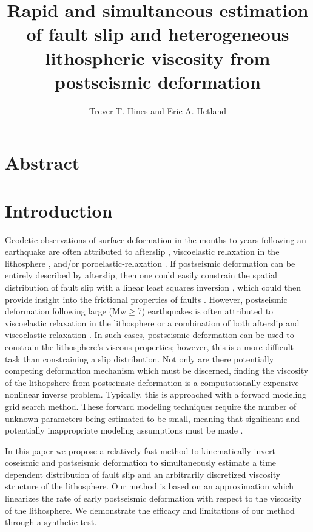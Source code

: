 \documentclass[12pt]{article}
\begin{document}
\title{Rapid and simultaneous estimation of fault slip and
  heterogeneous lithospheric viscosity from postseismic deformation}
\author{Trever T. Hines and Eric A. Hetland} \maketitle
\section{Abstract}

\section{Introduction}
Geodetic observations of surface deformation in the months to years
following an earthquake are often attributed to afterslip
\citep[e.g.][]{M1991}, viscoelastic relaxation in the lithosphere
\citep[e.g.][]{NM1974}, and/or poroelastic-relaxation
\citep[e.g.][]{P1998,J2003}.  If postseismic deformation can be
entirely described by afterslip, then one could easily constrain the
spatial distribution of fault slip with a linear least squares
inversion \citep[e.g.][]{F2007,B2002,H1987}, which could then provide
insight into the frictional properties of faults
\citep[e.g.][]{B2009}.  However, postseismic deformation following
large (Mw$\geq$7) earthquakes is often attributed to viscoelastic
relaxation in the lithosphere \citep[e.g.][]{P2003,P2005,HH2003} or a
combination of both afterslip and viscoelastic relaxation
\citep[e.g.][]{H2008,R2015}.  In such cases, postseismic deformation
can be used to constrain the lithosphere's viscous properties;
however, this is a more difficult task than constraining a slip
distribution.  Not only are there potentially competing deformation
mechanism which must be discerned, finding the viscosity of
the lithopshere from postseimsic deformation is a computationally
expensive nonlinear inverse problem.  Typically, this is approached
with a forward modeling grid search method.  These forward modeling
techniques require the number of unknown parameters being estimated to
be small, meaning that significant and potentially inappropriate
modeling assumptions must be made \citep{H2013,RG2008}.

In this paper we propose a relatively fast method to kinematically
invert coseismic and postseismic deformation to simultaneously
estimate a time dependent distribution of fault slip and an
arbitrarily discretized viscosity structure of the lithosphere.  Our
method is based on an approximation which linearizes the rate of early
postseismic deformation with respect to the viscosity of the
lithosphere.  We demonstrate the efficacy and limitations of our
method through a synthetic test.
\end{document}

